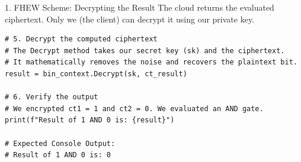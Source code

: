 \documentclass[aspectratio=169, 10pt]{beamer}
\begin{document}
\begin{frame}[fragile]{1. FHEW Scheme: Decrypting the Result}
The cloud returns the evaluated ciphertext. Only we (the client) can decrypt it using our private key.
\vspace{0.2cm}
\begin{lstlisting}[firstnumber=41]
# 5. Decrypt the computed ciphertext
# The Decrypt method takes our secret key (sk) and the ciphertext.
# It mathematically removes the noise and recovers the plaintext bit.
result = bin_context.Decrypt(sk, ct_result)

# 6. Verify the output
# We encrypted ct1 = 1 and ct2 = 0. We evaluated an AND gate.
print(f"Result of 1 AND 0 is: {result}")

# Expected Console Output:
# Result of 1 AND 0 is: 0
\end{lstlisting}
\end{frame}
\end{document}
